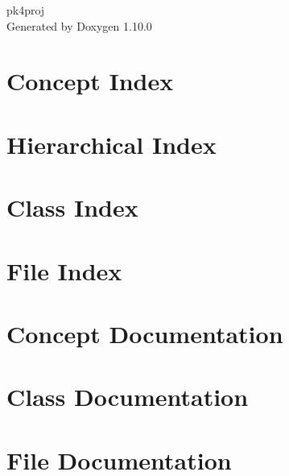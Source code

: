 \documentclass[twoside]{book}
\newcommand{\+}{\discretionary{\mbox{\scriptsize$\hookleftarrow$}}{}{}}
\newcommand{\clearemptydoublepage}{%
    \newpage{\pagestyle{empty}\cleardoublepage}%
  }
\begin{document}
  \raggedbottom
  \begin{titlepage}
  \vspace*{7cm}
  \begin{center}%
  {\Large pk4proj}\\
  \vspace*{1cm}
  {\large Generated by Doxygen 1.10.0}\\
  \end{center}
  \end{titlepage}
  \clearemptydoublepage
  \tableofcontents
  \clearemptydoublepage
\chapter{Concept Index}

\chapter{Hierarchical Index}

\chapter{Class Index}

\chapter{File Index}

\chapter{Concept Documentation}

\chapter{Class Documentation}










\chapter{File Documentation}































  \backmatter
  \newpage
  \clearemptydoublepage
  \printindex
\end{document}
